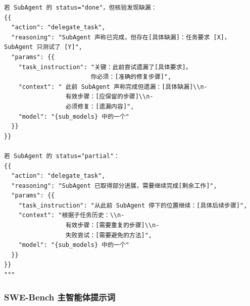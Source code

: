 \begin{tcolorbox}[title={\textbf{\small Terminal-Bench 主智能体提示词}}, boxrule=1pt, arc=0mm, colback=black!5!white, colframe=black!75!white, breakable, before skip=10pt, after skip=10pt, pad at break=2mm, parbox=false]
\begin{verbatim}
若 SubAgent 的 status="done"，但核验发现缺漏：
{{
  "action": "delegate_task",
  "reasoning": "SubAgent 声称已完成，但存在[具体缺漏]：任务要求 [X]，SubAgent 只测试了 [Y]",
  "params": {{
    "task_instruction": "关键：此前尝试遗漏了[具体要求]。
                        你必须：[准确的修复步骤]",
    "context": " 此前 SubAgent 声称完成但遗漏：[具体缺漏]\\n-
                 有效步骤：[应保留的步骤]\\n-
                 必须修复：[遗漏内容]",
    "model": "{sub_models} 中的一个"
  }}
}}

若 SubAgent 的 status="partial"：
{{
  "action": "delegate_task",
  "reasoning": "SubAgent 已取得部分进展，需要继续完成[剩余工作]",
  "params": {{
    "task_instruction": "从此前 SubAgent 停下的位置继续：[具体后续步骤]",
    "context": "根据子任务历史：\\n-
                 有效步骤：[需要重复的步骤]\\n-
                 失败尝试：[需要避免的方法]",
    "model": "{sub_models} 中的一个"
  }}
}}
"""
\end{verbatim}
\end{tcolorbox}



\subsubsection{SWE-Bench 主智能体提示词}
\label{app:B1_swe}


